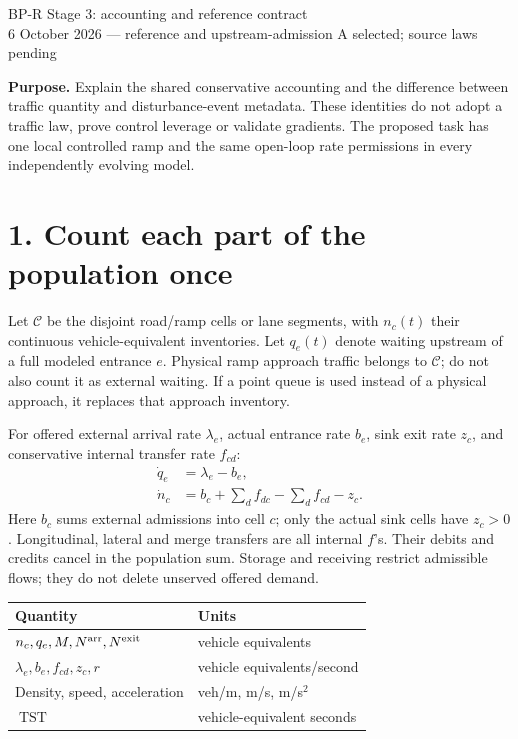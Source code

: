 \documentclass[11pt,a4paper]{article}
\newcommand{\TST}{\operatorname{TST}}
\begin{document}
\begin{center}
{\Large BP-R Stage 3: accounting and reference contract}\\[4pt]
6 October 2026 --- reference and upstream-admission A selected; source laws pending
\end{center}

\textbf{Purpose.} Explain the shared conservative accounting and the difference
between traffic quantity and disturbance-event metadata. These identities do not
adopt a traffic law, prove control leverage or validate gradients. The proposed
task has one local controlled ramp and the same open-loop rate permissions in
every independently evolving model.

\section*{1. Count each part of the population once}
Let $\mathcal C$ be the disjoint road/ramp cells or lane segments, with $n_c(t)$
their continuous vehicle-equivalent inventories. Let $q_e(t)$ denote waiting
upstream of a full modeled entrance $e$. Physical ramp approach traffic belongs
to $\mathcal C$; do not also count it as external waiting. If a point queue is
used instead of a physical approach, it replaces that approach inventory.

For offered external arrival rate $\lambda_e$, actual entrance rate $b_e$, sink
exit rate $z_c$, and conservative internal transfer rate $f_{cd}$:
\begin{align}
\dot q_e &= \lambda_e-b_e, \label{queue}\\
\dot n_c &= b_c+\sum_{d} f_{dc}-\sum_d f_{cd}-z_c. \label{cells}
\end{align}
Here $b_c$ sums external admissions into cell $c$; only the actual sink cells
have $z_c>0$. Longitudinal, lateral and merge transfers are all internal $f$'s.
Their debits and credits cancel in the population sum. Storage and receiving
restrict admissible flows; they do not delete unserved offered demand.

\begin{center}
\begin{tabular}{ll}
\toprule
Quantity & Units\\\midrule
$n_c,q_e,M,N^{\rm arr},N^{\rm exit}$ & vehicle equivalents\\
$\lambda_e,b_e,f_{cd},z_c,r$ & vehicle equivalents/second\\
Density, speed, acceleration & veh/m, m/s, m/s$^2$\\
$\TST$ & vehicle-equivalent seconds\\\bottomrule
\end{tabular}
\end{center}
\end{document}
